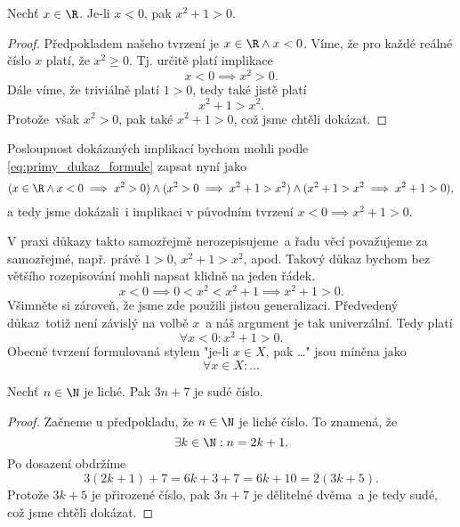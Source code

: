 \begin{proposition}
    Nechť $x\in\R$. Je-li $x<0$, pak $x^2+1>0$.
\end{proposition}
\begin{proof}
    Předpokladem našeho tvrzení je $x\in\R \land x<0$. Víme, že pro každé reálné číslo $x$ platí, že $x^2\geq 0$. Tj. určitě platí implikace
    \begin{equation*}
        x<0 \implies x^2>0.
    \end{equation*}
    Dále víme, že triviálně platí $1>0$, tedy také jistě platí
    \begin{equation*}
        x^2+1>x^2.
    \end{equation*}
    Protože~však $x^2>0$, pak také
    $x^2+1>0$, což jsme chtěli dokázat.
\end{proof}
Posloupnost dokázaných implikací bychom mohli podle \eqref{eq:primy_dukaz_formule} zapsat nyní jako
\begin{equation*}
    (x\in\R \land x<0 \implies x^2>0) \land (x^2>0 \implies x^2+1>x^2) \land (x^2+1>x^2 \implies x^2+1>0),
\end{equation*}
a tedy jsme dokázali~i implikaci v původním tvrzení $x<0 \implies x^2+1>0$.\par
V praxi důkazy takto samozřejmě nerozepisujeme~a řadu věcí považujeme za samozřejmé, např. právě $1>0$, $x^2+1>x^2$, apod. Takový důkaz bychom bez většího rozepisování mohli napsat klidně na jeden řádek.
\begin{equation*}
    x<0 \implies 0<x^2<x^2+1 \implies x^2+1>0.
\end{equation*}
Všimněte si zároveň, že jsme zde použili jistou generalizaci. Předvedený důkaz~totiž není závislý na volbě $x$~a náš argument je tak univerzální. Tedy platí
\begin{equation*}
    \forall x<0: x^2+1>0.
\end{equation*}
Obecně tvrzení formulovaná stylem "je-li $x\in X$, pak \dots" jsou míněna jako
\begin{equation*}
    \forall x\in X: \dots
\end{equation*}
\begin{proposition}
    Nechť $n\in\N$ je liché. Pak $3n+7$ je sudé číslo.
\end{proposition}
\begin{proof}
    Začneme u předpokladu, že $n\in\N$ je liché číslo. To znamená, že
    \begin{equation*}
        \exists k\in\N : n=2k+1.
    \end{equation*}
    Po dosazení obdržíme
    \begin{equation*}
        3(2k+1)+7=6k+3+7=6k+10=2(3k+5).
    \end{equation*}
    Protože $3k+5$ je přirozené číslo, pak $3n+7$ je dělitelné dvěma~a je tedy sudé, což jsme chtěli dokázat.
\end{proof}
